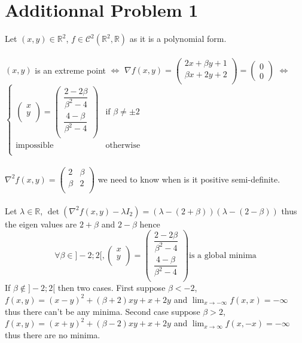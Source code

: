 \documentclass{article}
\begin{document}
\section*{Additionnal Problem 1} 
Let $(x,y)\in\mathbb{R}^2$, $f\in\mathcal{C}^2(\mathbb{R}^2,\mathbb{R})$ as it is a polynomial form.
\\\\
$(x,y)$ is an extreme point $\Leftrightarrow$ $\nabla f(x,y) = \left(\begin{array}{c}
    2x+\beta y +1\\
    \beta x +2y+2\\
\end{array}\right) = \left(\begin{array}{c}
    0\\
    0
\end{array}\right)$ $\Leftrightarrow$ $\boxed{\left\{\begin{array}{ll}
    \left(\begin{array}{c}x\\y\\\end{array}\right) = \left(\begin{array}{c}\dfrac{2-2\beta}{\beta^2-4}\\\dfrac{4-\beta}{\beta^2-4}\\\end{array}\right)&\text{if }\beta\neq \pm 2\\
    \text{impossible} &\text{otherwise}\\
\end{array}\right.}$
\\\\
$\nabla^2f(x,y) = \left(\begin{array}{cc}
    2&\beta\\
    \beta&2\\
\end{array}\right)$ we need to know when is it positive semi-definite. \\\\
Let $\lambda\in \mathbb{R}$, $\det(\nabla^2f(x,y)-\lambda I_2) = (\lambda-(2+\beta))(\lambda-(2-\beta))$ thus the eigen values are $2+\beta$ and $2-\beta$ hence $$\boxed{\forall \beta \in ]-2;2[, \left(\begin{array}{c}x\\y\\\end{array}\right) = \left(\begin{array}{c}\dfrac{2-2\beta}{\beta^2-4}\\\dfrac{4-\beta}{\beta^2-4}\\\end{array}\right) \text{is a global minima}}$$
If $\beta\notin ]-2;2[$ then two cases. First suppose $\beta<-2$, $f(x,y) = (x-y)^2+(\beta+2)xy+x+2y$ and $\lim_{x\to - \infty}f(x,x) = -\infty$ thus there can't be any minima. Second case suppose $\beta>2$, $f(x,y) = (x+y)^2+(\beta-2)xy+x+2y$ and $\lim_{x\to \infty}f(x,-x) = -\infty$ thus there are no minima.
\end{document}
